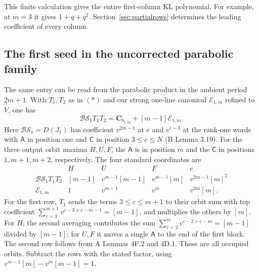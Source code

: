 This finite calculation gives the entire first-column KL polynomial. For example, at $m=3$ it gives $1+q+q^2$. Section~\ref{sec:partialrows} determines the leading coefficient of every column.


\subsection*{The first seed in the uncorrected parabolic family}
The same entry can be read from the parabolic product in the ambient period
\(2m+1\). With \(T_1,T_2\) as in \((*)\) and our strong one-line
canonical \(\mathcal E_{1,m}\) refined to \(V\), one has
\[
 \mathcal{BS}_1T_1T_2=\mathbf C_{b_{1;m}}+[m-1]\mathcal E_{1,m}.
\]
Here \(\mathcal{BS}_1=D(J_1)\) has coefficient \(v^{2m-1}\) at \(e\)
and \(v^{c-3}\) at the rank-one words with \(\mathsf A\) in position
one and \(\mathsf C\) in position \(3\le c\le N\) (B Lemma 3.19).
For the three output orbit maxima \(H,U,F\), the \(\mathsf A\) is in
position \(m\) and the \(\mathsf C\) in positions \(1,m+1,m+2\),
respectively. The four standard coordinates are
\[
\begin{array}{c|cccc}
 &H&U&F&e\\ \hline
 \mathcal{BS}_1T_1T_2 &[m-1]&v^{m-1}[m-1]&v^{m-1}[m]&v^{2m-1}[m]^2\\
 \mathcal E_{1,m} &1&v^{m-1}&v^m&v^{2m}[m].
\end{array}
\]
For the first row, \(T_1\) sends the terms \(3\le c\le m+1\) to
their orbit sum with top coefficient
\(\sum_{c=3}^{m+1}v^{c-3+c-m-1}=[m-1]\), and multiplies the others
by \([m]\). For \(H\), the second averaging contributes the sum
\(\sum_{c=2}^m v^{c-2+c-m}=[m-1]\) divided by \([m-1]\);
for \(U,F\) it moves a single \(\mathsf A\) to the end of the first
block. The second row follows from A Lemmas 4F.2 and 4D.1.
These are all occupied orbits. Subtract the rows with the stated factor,
using \(v^{m-1}[m]-v^m[m-1]=1\).

\newpage
